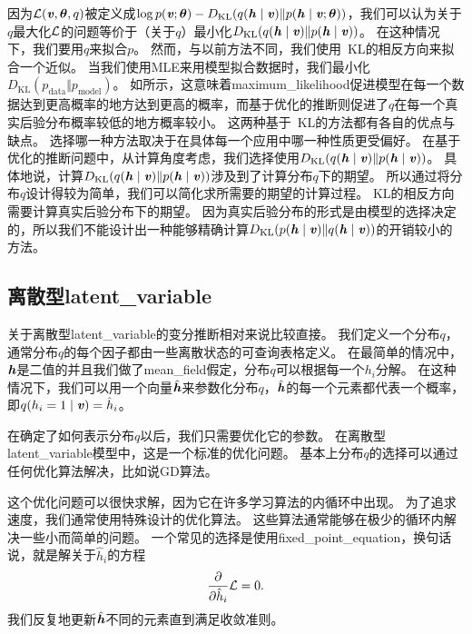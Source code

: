 因为$\mathcal{L}(\boldsymbol{\mathit{v}},\boldsymbol{\theta},q)$被定义成$\log p(\boldsymbol{\mathit{v}};\boldsymbol{\theta}) - D_{\text{KL}} (q(\boldsymbol{\mathit{h}}\mid\boldsymbol{\mathit{v}}) \Vert  p(\boldsymbol{\mathit{h}}\mid\boldsymbol{\mathit{v}};\boldsymbol{\theta}) )$，我们可以认为关于$q$最大化$\mathcal{L}$的问题等价于（关于$q$）最小化$D_{\text{KL}}(q(\boldsymbol{\mathit{h}}\mid\boldsymbol{\mathit{v}})\Vert p(\boldsymbol{\mathit{h}}\mid\boldsymbol{\mathit{v}}))$。
在这种情况下，我们要用$q$来拟合$p$。
然而，与以前方法不同，我们使用~\gls{KL}的相反方向来拟合一个近似。
当我们使用\gls{MLE}来用模型拟合数据时，我们最小化$D_{\text{KL}}(p_{\text{data}} \Vert p_{\text{model}})$。
如所示，这意味着\gls{maximum_likelihood}促进模型在每一个数据达到更高概率的地方达到更高的概率，而基于优化的推断则促进了$q$在每一个真实后验分布概率较低的地方概率较小。
这两种基于~\gls{KL}的方法都有各自的优点与缺点。
选择哪一种方法取决于在具体每一个应用中哪一种性质更受偏好。
在基于优化的推断问题中，从计算角度考虑，我们选择使用$D_{\text{KL}}(q(\boldsymbol{\mathit{h}}\mid\boldsymbol{\mathit{v}})\Vert p(\boldsymbol{\mathit{h}}\mid\boldsymbol{\mathit{v}}))$。
具体地说，计算$D_{\text{KL}}(q(\boldsymbol{\mathit{h}}\mid\boldsymbol{\mathit{v}})\Vert p(\boldsymbol{\mathit{h}}\mid\boldsymbol{\mathit{v}}))$涉及到了计算分布$q$下的期望。
所以通过将分布$q$设计得较为简单，我们可以简化求所需要的期望的计算过程。
\gls{KL}的相反方向需要计算真实后验分布下的期望。
因为真实后验分布的形式是由模型的选择决定的，所以我们不能设计出一种能够精确计算$D_{\text{KL}}(p(\boldsymbol{\mathit{h}}\mid\boldsymbol{\mathit{v}}) \Vert q(\boldsymbol{\mathit{h}}\mid\boldsymbol{\mathit{v}}))$的开销较小的方法。




\subsection{离散型\gls{latent_variable}}
\label{sec:discrete_latent_variables}

关于离散型\gls{latent_variable}的变分推断相对来说比较直接。
我们定义一个分布$q$，通常分布$q$的每个因子都由一些离散状态的可查询表格定义。
在最简单的情况中，$\boldsymbol{\mathit{h}}$是二值的并且我们做了\gls{mean_field}假定，分布$q$可以根据每一个$h_i$分解。
在这种情况下，我们可以用一个向量$\hat{\boldsymbol{\mathit{h}}}$来参数化分布$q$，$\hat{\boldsymbol{\mathit{h}}}$的每一个元素都代表一个概率，即$q(h_i = 1\mid \boldsymbol{\mathit{v}}) = \hat{h}_i$。


在确定了如何表示分布$q$以后，我们只需要优化它的参数。
在离散型\gls{latent_variable}模型中，这是一个标准的优化问题。
基本上分布$q$的选择可以通过任何优化算法解决，比如说\gls{GD}算法。


这个优化问题可以很快求解，因为它在许多学习算法的内循环中出现。
为了追求速度，我们通常使用特殊设计的优化算法。
这些算法通常能够在极少的循环内解决一些小而简单的问题。
一个常见的选择是使用\gls{fixed_point_equation}，换句话说，就是解关于$\hat{h}_i$的方程
\begin{align}
	\frac{\partial}{\partial \hat{h}_i}\mathcal{L} = 0.
\end{align}
我们反复地更新$\hat{\boldsymbol{\mathit{h}}}$不同的元素直到满足收敛准则。


